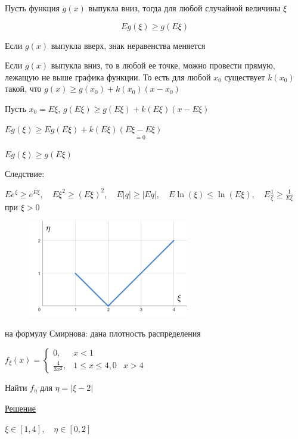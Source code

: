 \documentclass[12pt]{article}
\begin{document}
    \begin{MyTheorem}
         Пусть функция $g(x)$ выпукла вниз, тогда для любой случайной величины $\xi$

        \[Eg(\xi) \geq g(E\xi)\]
    \end{MyTheorem}

    \Nota Если $g(x)$ выпукла вверх, знак неравенства меняется
    
    \begin{MyProof}
        Если $g(x)$ выпукла вниз, то в любой ее точке, можно провести прямую, лежащую не выше графика функции. То есть для 
        любой $x_0$ существует $k(x_0)$ такой, что $g(x) \geq g(x_0) + k(x_0) (x - x_0)$

        Пусть $x_0 = E\xi$, $g(E\xi) \geq g(E\xi) + k(E\xi) (x - E\xi)$

        $Eg(\xi) \geq Eg(E\xi) + k(E\xi) \underset{= 0}{(E\xi - E\xi)}$

        $Eg(\xi) \geq g(E\xi)$
    \end{MyProof}


    Следствие:

    $Ee^\xi \geq e^{E\xi}, \quad E\xi^2 \geq (E\xi)^2, \quad E|q| \geq |Eq|, \quad E\ln(\xi) \leq \ln(E\xi), \quad E\frac{1}{\xi} \geq \frac{1}{E\xi}$ при $\xi > 0$


    \begin{minipage}{\textwidth}
        \begin{figure}
            \includegraphics[width=7cm]{probtheory/images/probtheory_2024_11_05_1}
        \end{figure}

        \Ex на формулу Смирнова: дана плотность распределения
    
        $f_\xi(x) = \begin{cases}0, & x < 1 \\ \frac{4}{3x^2}, & 1 \leq x \leq 4, 0 & x > 4\end{cases}$
    
        Найти $f_\eta$ для $\eta = |\xi - 2|$

        \underline{Решение}

        $\xi \in [1, 4], \quad \eta \in [0, 2]$
    \end{minipage}
\end{document}
